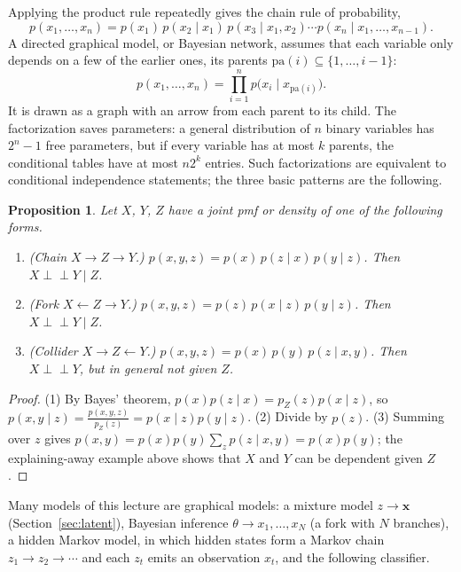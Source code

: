 \documentclass[11pt]{article}
\newcommand{\indep}{\perp\!\!\!\perp}
\theoremstyle{definition}
\theoremstyle{plain}
\newtheorem{proposition}[definition]{Proposition}
\theoremstyle{remark}
\begin{document}
Applying the product rule repeatedly gives the chain rule of probability,
\[p(x_1, \ldots, x_n) = p(x_1)\,p(x_2 \mid x_1)\,p(x_3 \mid x_1, x_2) \cdots p(x_n \mid x_1, \ldots, x_{n-1}).\]
A directed graphical model, or Bayesian network, assumes that each variable only depends on a few of the earlier ones, its parents $\mathrm{pa}(i) \subseteq \{1, \ldots, i - 1\}$:
\[p(x_1, \ldots, x_n) = \prod_{i=1}^n p\big(x_i \mid x_{\mathrm{pa}(i)}\big).\]
It is drawn as a graph with an arrow from each parent to its child. The factorization saves parameters: a general distribution of $n$ binary variables has $2^n - 1$ free parameters, but if every variable has at most $k$ parents, the conditional tables have at most $n2^k$ entries. Such factorizations are equivalent to conditional independence statements; the three basic patterns are the following.

\begin{proposition}\label{prop:three-graphs}
    Let $X$, $Y$, $Z$ have a joint pmf or density of one of the following forms.
    \begin{enumerate}
        \item (Chain $X \to Z \to Y$.) $p(x, y, z) = p(x)\,p(z \mid x)\,p(y \mid z)$. Then $X \indep Y \mid Z$.
        \item (Fork $X \leftarrow Z \to Y$.) $p(x, y, z) = p(z)\,p(x \mid z)\,p(y \mid z)$. Then $X \indep Y \mid Z$.
        \item (Collider $X \to Z \leftarrow Y$.) $p(x, y, z) = p(x)\,p(y)\,p(z \mid x, y)$. Then $X \indep Y$, but in general not given $Z$.
    \end{enumerate}
\end{proposition}

\begin{proof}
    (1) By Bayes' theorem, $p(x)p(z \mid x) = p_Z(z)p(x \mid z)$, so $p(x, y \mid z) = \frac{p(x, y, z)}{p_Z(z)} = p(x \mid z)p(y \mid z)$. (2) Divide by $p(z)$. (3) Summing over $z$ gives $p(x, y) = p(x)p(y)\sum_z p(z \mid x, y) = p(x)p(y)$; the explaining-away example above shows that $X$ and $Y$ can be dependent given $Z$.
\end{proof}

Many models of this lecture are graphical models: a mixture model $z \to \mathbf{x}$ (Section~\ref{sec:latent}), Bayesian inference $\theta \to x_1, \ldots, x_N$ (a fork with $N$ branches), a hidden Markov model, in which hidden states form a Markov chain $z_1 \to z_2 \to \cdots$ and each $z_t$ emits an observation $x_t$, and the following classifier.
\end{document}
